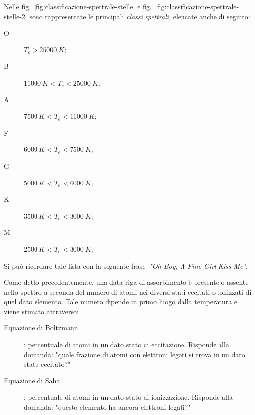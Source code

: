 Nelle fig.~\ref{fig:classificazione-spettrale-stelle} e fig.~\ref{fig:classificazione-spettrale-stelle-2} sono rappresentate le principali \emph{classi spettrali}, elencate anche di seguito:
\begin{description}
    \item[O] $T_e > \SI{25000}{K}$;
    \item[B] $ \SI{11000}{K} < T_e < \SI{25000}{K}$;
    \item[A] $ \SI{7500}{K} < T_e < \SI{11000}{K} $;
    \item[F] $ \SI{6000}{K} < T_e < \SI{7500}{K} $;
    \item[G] $ \SI{5000}{K} < T_e < \SI{6000}{K} $;
    \item[K] $ \SI{3500}{K} < T_e < \SI{3000}{K} $;
    \item[M] $ \SI{2500}{K} < T_e < \SI{3000}{K} $;
\end{description}
Si può ricordare tale lista con la seguente frase: \emph{"Oh Boy, A Fine Girl Kiss Me"}.

Come detto precedentemente, una data riga di assorbimento è presente o assente nello spettro a seconda del numero di atomi nei diversi stati eccitati o ionizzati di quel dato elemento. Tale numero dipende in primo luogo dalla temperatura e viene stimato attraverso:
\begin{description}
    \item[Equazione di Boltzmann]: percentuale di atomi in un dato stato di eccitazione. Risponde alla domanda: "quale frazione di atomi con elettroni legati si trova in un dato stato eccitato?"
    \item[Equazione di Saha]: percentuale di atomi in un dato stato di ionizzazione. Risponde alla domanda: "questo elemento ha ancora elettroni legati?"
\end{description}

